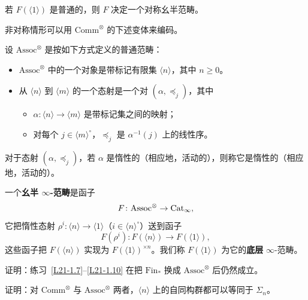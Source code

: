 \begin{exercise}\label{L21-1.10}
若 $F(\langle 1\rangle)$ 是普通的，则 $F$ 决定一个对称幺半范畴。
\end{exercise}

\nitem\label{L21-1.11} 非对称情形可以用 $\mathrm{Comm}^{\otimes}$ 的下述变体来编码。

\begin{definition}\label{L21-1.12}
设 $\mathrm{Assoc}^{\otimes}$ 是按如下方式定义的普通范畴：
\begin{itemize}[leftmargin=2.2em,itemsep=0.1em]
\item $\mathrm{Assoc}^{\otimes}$ 中的一个对象是带标记有限集 $\langle n\rangle$，其中 $n\ge0$。
\item 从 $\langle n\rangle$ 到 $\langle m\rangle$ 的一个态射是一个对 $(\alpha,\preceq_j)$，其中
\begin{itemize}[leftmargin=1.9em,itemsep=0.05em]
\item $\alpha\colon\langle n\rangle\to\langle m\rangle$ 是带标记集之间的映射；
\item 对每个 $j\in\langle m\rangle^{\circ}$，$\preceq_j$ 是 $\alpha^{-1}(j)$ 上的线性序。
\end{itemize}
\end{itemize}
对于态射 $(\alpha,\preceq_j)$，若 $\alpha$ 是惰性的（相应地，活动的），则称它是惰性的（相应地，活动的）。
\end{definition}

\begin{definition}\label{L21-1.13}
一个\textbf{幺半 $\infty$-范畴}是函子
\[
F\colon\mathrm{Assoc}^{\otimes}\to\operatorname{Cat}_{\infty},
\]
它把惰性态射 $\rho^{i}\colon\langle n\rangle\to\langle 1\rangle$（$i\in\langle n\rangle^{\circ}$）送到函子
\[
F(\rho^{i})\colon F(\langle n\rangle)\to F(\langle 1\rangle),
\]
这些函子把 $F(\langle n\rangle)$ 实现为 $F(\langle 1\rangle)^{\times n}$。我们称 $F(\langle 1\rangle)$ 为它的\textbf{底层} $\infty$-范畴。
\end{definition}

\begin{exercise}\label{L21-1.14}
证明：练习~\ref{L21-1.7}--\ref{L21-1.10} 在把 $\mathrm{Fin}_{*}$ 换成 $\mathrm{Assoc}^{\otimes}$ 后仍然成立。
\end{exercise}

\begin{exercise}\label{L21-1.15}
证明：对 $\mathrm{Comm}^{\otimes}$ 与 $\mathrm{Assoc}^{\otimes}$ 两者，$\langle n\rangle$ 上的自同构群都可以等同于 $\Sigma_n$。
\end{exercise}

